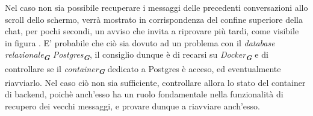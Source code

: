 Nel caso non sia possibile recuperare i messaggi delle precedenti conversazioni allo scroll dello schermo, verrà mostrato in corrispondenza del confine superiore della chat, per pochi secondi, un avviso che invita a riprovare più tardi, come visibile in figura . E' probabile che ciò sia dovuto ad un problema con il \emph{database relazionale}\textsubscript{\textbf{\textit{G}}} \emph{Postgres}\textsubscript{\textbf{\textit{G}}}, il consiglio dunque è di recarsi su \emph{Docker}\textsubscript{\textbf{\textit{G}}} e di controllare se il \emph{container}\textsubscript{\textbf{\textit{G}}} dedicato a Postgres è acceso, ed eventualmente riavviarlo. Nel caso ciò non sia sufficiente, controllare allora lo stato del container di backend, poichè anch'esso ha un ruolo fondamentale nella funzionalità di recupero dei vecchi messaggi, e provare dunque a riavviare anch'esso.



